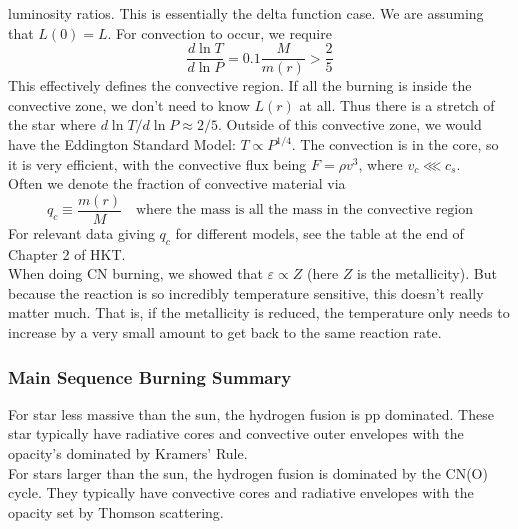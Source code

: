 \documentclass[10pt]{article}
\numberwithin{equation}{section}
\newcommand{\n}{\noindent}
\begin{document}
    luminosity ratios. This is essentially the delta function case. We
    are assuming that $L(0)=L$. For convection to occur, we require
    \begin{equation}
      \label{eq:191}
      \frac{d\ln T}{d\ln P}=0.1\frac{M}{m(r)}>\frac{2}{5}
    \end{equation}
    This effectively defines the convective region. If all the burning
    is inside the convective zone, we don't need to know $L(r)$ at
    all. Thus there is a stretch of the star where $d\ln T/d\ln P
    \approx 2/5$. Outside of this convective zone, we would have
    the Eddington Standard Model: $T\propto P^{1/4}$. The convection
    is in the core, so it is very efficient, with the convective flux
    being $F=\rho v^3$, where $v_c\lll c_s$.\\

    \n Often we denote the fraction of convective material via
    \begin{equation}
      \label{eq:192}
      q_c\equiv \frac{m(r)}{M} \quad\textrm{where the mass is all the
        mass in the convective region}
    \end{equation}
    For relevant data giving $q_c$ for different models, see the table
    at the end of Chapter 2 of HKT.\\

    \n When doing CN burning, we showed that $\varepsilon\propto Z$
    (here $Z$ is the metallicity). But because the reaction is so
    incredibly temperature sensitive, this doesn't really matter
    much. That is, if the metallicity is reduced, the temperature only
    needs to increase by a very small amount to get back to the same
    reaction rate.

    \subsubsection{Main Sequence Burning Summary}
    \label{sec:main-sequ-burn}

    For star less massive than the sun, the hydrogen fusion is pp
    dominated. These star typically have radiative cores and
    convective outer envelopes with the opacity's dominated by
    Kramers' Rule.\\

    \n For stars larger than the sun, the hydrogen fusion is dominated
    by the CN(O) cycle. They typically have convective cores and
    radiative envelopes with the opacity set by Thomson scattering.
		
\end{document}
